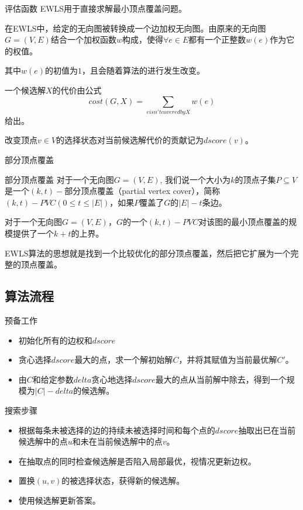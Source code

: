 \documentclass[9pt,dvipsnames,table,UTF8,aspectratio=169]{beamer}
\begin{document}
\begin{frame}{评估函数}
	EWLS用于直接求解最小顶点覆盖问题。

	在EWLS中，给定的无向图被转换成一个边加权无向图。由原来的无向图$G = (V,E)$结合一个加权函数$w$构成，使得$\forall e \in E$都有一个正整数$w(e)$作为它的权值。

	其中$w(e)$的初值为$1$，且会随着算法的进行发生改变。

	一个候选解$X$的代价由公式$$cost(G,X) = \sum_{e isn't covered by X} w(e)$$给出。

	改变顶点$v \in V$的选择状态对当前候选解代价的贡献记为$dscore(v)$。
\end{frame}

\begin{frame}{部分顶点覆盖}
	\begin{definition}{部分顶点覆盖}
		对于一个无向图$G = (V,E)$, 我们说一个大小为$k$的顶点子集$P \subseteq V$是一个$(k, t)-$部分顶点覆盖（partial vertex cover），简称$(k, t)-PVC (0 \le t \le |E|)$，如果$P$覆盖了$G$的$|E| − t$条边。
	\end{definition}

	\begin{theorem}
		对于一个无向图$G = (V,E)$，$G$的一个$(k, t)-PVC$对该图的最小顶点覆盖的规模提供了一个$k + t$的上界。
	\end{theorem}

	EWLS算法的思想就是找到一个比较优化的部分顶点覆盖，然后把它扩展为一个完整的顶点覆盖。
\end{frame}

\subsection{算法流程}
\begin{frame}{预备工作}
	\begin{itemize}
		\item 初始化所有的边权和$dscore$
		\item 贪心选择$dscore$最大的点，求一个解初始解$C$，并将其赋值为当前最优解$C'$。
		\item 由$C$和给定参数$delta$贪心地选择$dscore$最大的点从当前解中除去，得到一个规模为$|C| - delta$的候选解。
	\end{itemize}
\end{frame}

\begin{frame}{搜索步骤}
	\begin{itemize}
		\item 根据每条未被选择的边的持续未被选择时间和每个点的$dscore$抽取出已在当前候选解中的点$u$和未在当前候选解中的点$v$。
		\item 在抽取点的同时检查候选解是否陷入局部最优，视情况更新边权。
		\item 置换$(u,v)$的被选择状态，获得新的候选解。
		\item 使用候选解更新答案。
	\end{itemize}
\end{frame}
\end{document}
